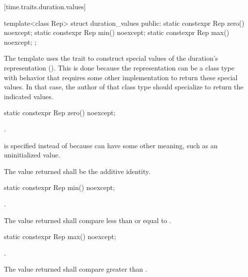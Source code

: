 [time.traits.duration.values]{}

%
\begin{itemdecl}
template<class Rep>
  struct duration_values {
  public:
    static constexpr Rep zero() noexcept;
    static constexpr Rep min() noexcept;
    static constexpr Rep max() noexcept;
};
\end{itemdecl}

\pnum
The  template uses the  trait to
construct special values of the duration's representation (). This is
done because the representation can be a class type with behavior that
requires some other implementation to return these special values. In that case,
the author of that class type should specialize  to
return the indicated values.

%
\begin{itemdecl}
static constexpr Rep zero() noexcept;
\end{itemdecl}

\begin{itemdescr}
\pnum
\returns
{}.
\begin{note}
 is specified instead of
 because  can have some other meaning, such as an
uninitialized value.
\end{note}

\pnum
\remarks
The value returned shall be the additive identity.
\end{itemdescr}

%
\begin{itemdecl}
static constexpr Rep min() noexcept;
\end{itemdecl}

\begin{itemdescr}
\pnum
\returns
{}.

\pnum
\remarks
The value returned shall compare less than or equal to .
\end{itemdescr}

%
\begin{itemdecl}
static constexpr Rep max() noexcept;
\end{itemdecl}

\begin{itemdescr}
\pnum
\returns
{}.

\pnum
\remarks
The value returned shall compare greater than .
\end{itemdescr}

